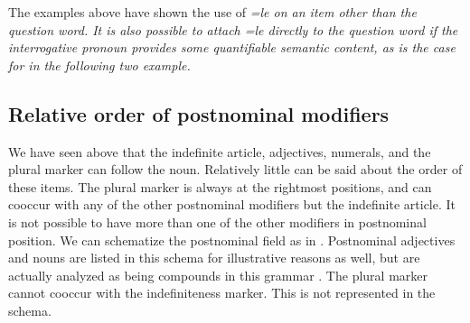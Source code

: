


The examples above have shown the use of \em =le \em on an item other than the question word. It is also possible to attach \em =le \em directly to the question word if the interrogative pronoun provides some quantifiable semantic content, as is the case for   in the following two example.


















\subsection{Relative order of postnominal modifiers}\label{sec:nppp:Relativeorderofpostnominalmodifiers}
We have seen above that  the indefinite article, adjectives, numerals, and the plural marker can follow the noun. Relatively little can be said about the order of these items. The plural marker is always at the rightmost positions, and can cooccur with any of the other postnominal modifiers but the indefinite article.  It is not possible to have more than one of the other modifiers in postnominal position. We can schematize the postnominal field  as in . Postnominal adjectives and nouns are listed in this schema for illustrative reasons as well, but are actually analyzed as being compounds in this grammar  . The plural marker cannot cooccur with the indefiniteness marker. This is not represented in the schema.

